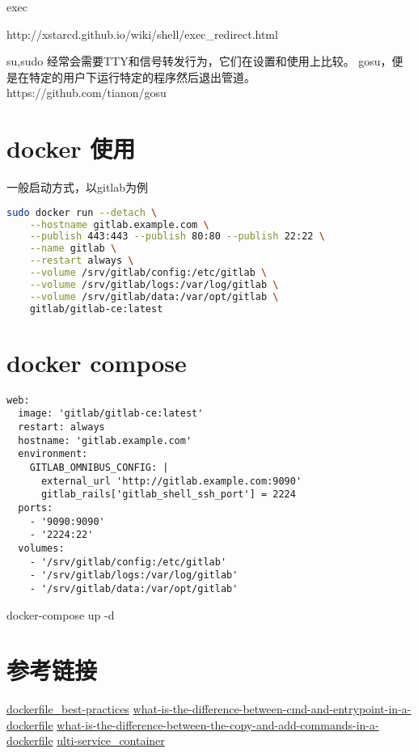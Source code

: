 	exec
	
	http://xstarcd.github.io/wiki/shell/exec_redirect.html

su,sudo 经常会需要TTY和信号转发行为，它们在设置和使用上比较。
gosu，便是在特定的用户下运行特定的程序然后退出管道。https://github.com/tianon/gosu

\section{docker 使用}

一般启动方式，以gitlab为例

\begin{lstlisting}[language=bash]
sudo docker run --detach \
    --hostname gitlab.example.com \
    --publish 443:443 --publish 80:80 --publish 22:22 \
    --name gitlab \
    --restart always \
    --volume /srv/gitlab/config:/etc/gitlab \
    --volume /srv/gitlab/logs:/var/log/gitlab \
    --volume /srv/gitlab/data:/var/opt/gitlab \
    gitlab/gitlab-ce:latest
\end{lstlisting}

\section{docker compose}

\begin{lstlisting}
web:
  image: 'gitlab/gitlab-ce:latest'
  restart: always
  hostname: 'gitlab.example.com'
  environment:
    GITLAB_OMNIBUS_CONFIG: |
      external_url 'http://gitlab.example.com:9090'
      gitlab_rails['gitlab_shell_ssh_port'] = 2224
  ports:
    - '9090:9090'
    - '2224:22'
  volumes:
    - '/srv/gitlab/config:/etc/gitlab'
    - '/srv/gitlab/logs:/var/log/gitlab'
    - '/srv/gitlab/data:/var/opt/gitlab'
\end{lstlisting}

docker-compose up -d


\section{参考链接}

\href{https://docs.docker.com/engine/userguide/eng-image/dockerfile_best-practices/}{dockerfile_best-practices}
\href{https://stackoverflow.com/questions/21553353/what-is-the-difference-between-cmd-and-entrypoint-in-a-dockerfile}{what-is-the-difference-between-cmd-and-entrypoint-in-a-dockerfile}
\href{https://stackoverflow.com/questions/24958140/what-is-the-difference-between-the-copy-and-add-commands-in-a-dockerfile}{what-is-the-difference-between-the-copy-and-add-commands-in-a-dockerfile}
\href{https://docs.docker.com/engine/admin/multi-service_container/}{ulti-service_container}


